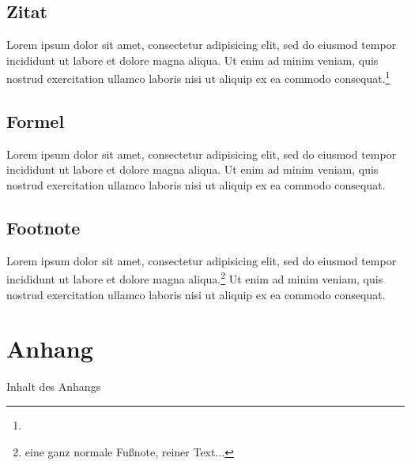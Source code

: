 \section{Zitat}
Lorem ipsum dolor sit amet, consectetur adipisicing elit, sed do eiusmod tempor incididunt ut labore et dolore magna aliqua. Ut enim ad minim veniam, quis nostrud exercitation ullamco laboris nisi ut aliquip ex ea commodo consequat.\footnote{ }

\section{Formel}
Lorem ipsum dolor sit amet, consectetur adipisicing elit, sed do eiusmod tempor incididunt ut labore et dolore magna aliqua. Ut enim ad minim veniam, quis nostrud exercitation ullamco laboris nisi ut aliquip ex ea commodo consequat.

\section{Footnote}
Lorem ipsum dolor sit amet, consectetur adipisicing elit, sed do eiusmod tempor incididunt ut labore et dolore magna aliqua.\footnote{eine ganz normale Fußnote, reiner Text...} Ut enim ad minim veniam, quis nostrud exercitation ullamco laboris nisi ut aliquip ex ea commodo consequat.

\seAppendix{}

\setcounter{page}{7}

\chapter{Anhang}

Inhalt des Anhangs

\newpage
\sePrintGlossary{}


\sePrintBibliography{}




\seEhrenwoertlicheErklaerung{}


